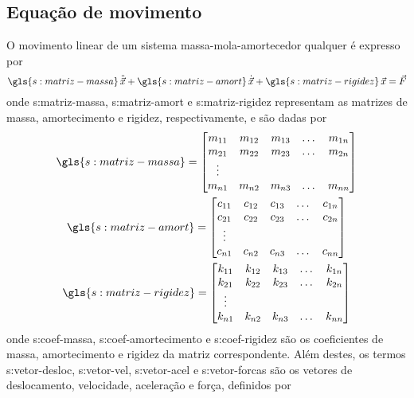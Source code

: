 \documentclass[12pt,oneside,english,brazil,lmodern,siglas,simbolos,cite=num]{ucsmonograph}
\begin{document}
	\subsection{Equação de movimento}
	O movimento linear de um sistema massa-mola-amortecedor qualquer é expresso por \cite{rao:2008}
	\begin{equation} \label{eqn:discr:movimento}
		\gls{s:matriz-massa}\,\ddot{\vec{x}} + \gls{s:matriz-amort}\,\dot{\vec{x}} + \gls{s:matriz-rigidez}\,\vec{x} = \vec{F}
	\end{equation}
	onde \gls{s:matriz-massa}, \gls{s:matriz-amort} e \gls{s:matriz-rigidez} representam as matrizes de massa, amortecimento e rigidez, respectivamente, e são dadas por
	\begin{gather} 
		\gls{s:matriz-massa} = 
		\begin{bmatrix} \label{eqn:matr:massa}
			m_{11} & m_{12} & m_{13} & \dots & m_{1n}\\
			m_{21} & m_{22} & m_{23} & \dots & m_{2n}\\
			\vdots\\
			m_{n1} & m_{n2} & m_{n3} & \dots & m_{nn}\\
		\end{bmatrix}\\
		\gls{s:matriz-amort} = 
		\begin{bmatrix} \label{eqn:matr:amort}
			c_{11} & c_{12} & c_{13} & \dots & c_{1n}\\
			c_{21} & c_{22} & c_{23} & \dots & c_{2n}\\
			\vdots\\
			c_{n1} & c_{n2} & c_{n3} & \dots & c_{nn}\\
		\end{bmatrix}\\
		\gls{s:matriz-rigidez} =
		\begin{bmatrix} \label{eqn:matr:rigid}
			k_{11} & k_{12} & k_{13} & \dots & k_{1n}\\
			k_{21} & k_{22} & k_{23} & \dots & k_{2n}\\
			\vdots\\
			k_{n1} & k_{n2} & k_{n3} & \dots & k_{nn}\\
		\end{bmatrix}
	\end{gather}
	onde \gls{s:coef-massa}, \gls{s:coef-amortecimento} e \gls{s:coef-rigidez} são os coeficientes de massa, amortecimento e rigidez da matriz correspondente.	Além destes, os termos \gls{s:vetor-desloc}, \gls{s:vetor-vel}, \gls{s:vetor-acel} e \gls{s:vetor-forcas} são os vetores de deslocamento, velocidade, aceleração e força, definidos por \cite{rao:2008}
\end{document}
